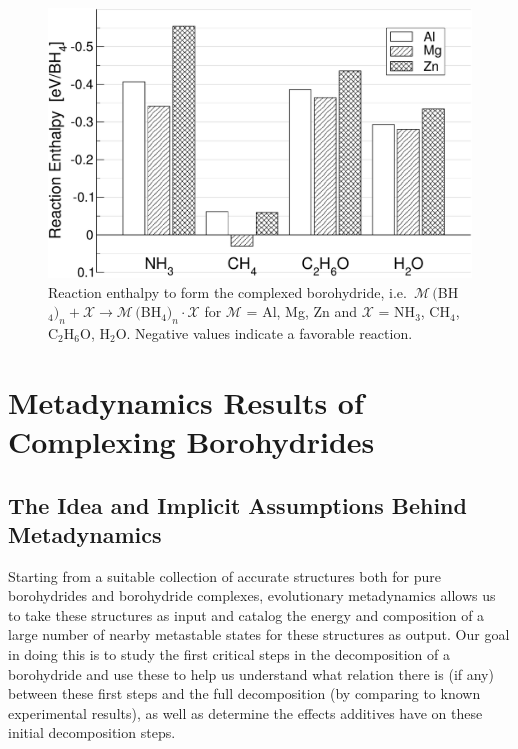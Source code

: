 \documentclass[twocolumn, prb, showpacs]{revtex4-1}
\newcommand{\metal}{\mathcal{M}}
\newcommand{\molecule}{\mathcal{X}}
\begin{document}
\begin{figure}
\includegraphics[width=\columnwidth]{reaction_enthalpy}
\caption{\label{fig:reaction_enthalpies}Reaction enthalpy to form the
complexed borohydride, i.e.\ $\metal\,($BH$_4)_n + \molecule\rightarrow
\metal\,($BH$_4)_n \cdot \molecule$ for $\metal$ = Al, Mg, Zn and
$\molecule$ = NH$_3$, CH$_4$, C$_2$H$_6$O, H$_2$O. Negative values
indicate a favorable reaction.}
\end{figure}








\section{Metadynamics Results of Complexing Borohydrides}


\subsection{The Idea and Implicit Assumptions Behind Metadynamics}

Starting from a suitable collection of accurate structures both for pure borohydrides and borohydride complexes, evolutionary metadynamics allows
us to take these structures as input and catalog the energy and composition of a large number of nearby metastable states for these structures as output. Our goal in doing this is
to study the first critical steps in the decomposition of a borohydride and use these to help us understand what relation there is (if any) between these
first steps and the full decomposition (by comparing to known experimental results), as well as determine the effects additives have on these initial
decomposition steps. 
\end{document}
